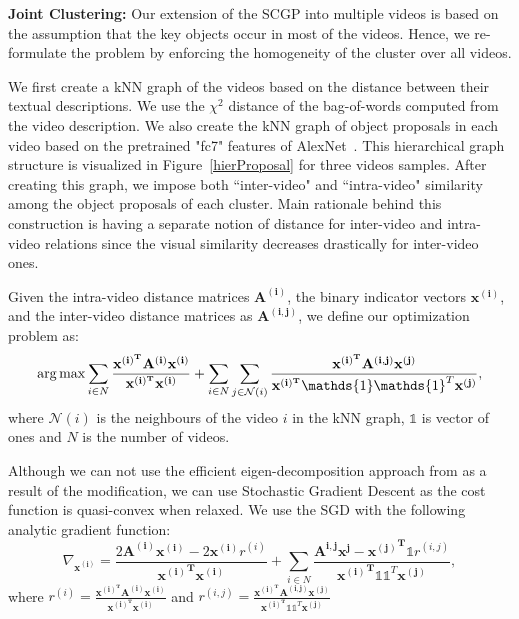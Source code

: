 \noindent\textbf{Joint Clustering:} Our extension of the SCGP into multiple videos is based on the assumption that the key objects occur in most of the videos. Hence, we re-formulate the problem by enforcing the homogeneity of the cluster over all videos.

We first create a kNN graph of the videos based on the distance between their textual descriptions. We use the $\chi^2$ distance of the bag-of-words computed from the video description. We also create the kNN graph of object proposals in each video based on the pretrained "fc7" features of AlexNet~\cite{alexnet}. This hierarchical graph structure is visualized in Figure~\ref{hierProposal} for three videos samples. After creating this graph, we impose both ``inter-video" and ``intra-video" similarity among the object proposals of each cluster. Main rationale behind this construction is having a separate notion of distance for inter-video and intra-video relations since the visual similarity decreases drastically for inter-video ones.

Given the intra-video distance matrices $\mathbf{A^{(i)}}$, the binary indicator vectors $\mathbf{x^{(i)}}$, and the inter-video distance matrices as $\mathbf{A^{(i,j)}}$, we define our optimization problem as:
\begin{equation}
\argmax \sum_{i \in N} \frac{\mathbf{x^{(i)^T}}\mathbf{A^{(i)}}\mathbf{x^{(i)}}}{\mathbf{x^{(i)^T}}\mathbf{x^{(i)}}} +
\sum_{i \in N} \sum_{j \in \mathcal{N}(i)} \frac{\mathbf{x^{(i)^T}}\mathbf{A^{(i,j)}}\mathbf{x^{(j)}}} {\mathbf{x^{(i)^T}}\mathds{1}\mathds{1}^T\mathbf{x^{(j)}}},
\end{equation}
where $\mathcal{N}(i)$ is the neighbours of the video $i$ in the kNN graph, $\mathds{1}$ is vector of ones and $N$ is the number of videos.

Although we can not use the efficient eigen-decomposition approach from \cite{scgp,scgp_eigen} as a result of the modification, we can use Stochastic Gradient Descent as the cost function is quasi-convex when relaxed. We use the SGD with the following analytic gradient function:
\begin{equation}
  \nabla_{\mathbf{x^{(i)}}} = \frac{2\mathbf{A^{(i)}} \mathbf{x^{(i)}} -2\mathbf{x^{(i)}} r^{(i)}}
  {\mathbf{{x^{(i)}}^T}\mathbf{x^{(i)}}}
+ \sum_{i \in N} \frac{\mathbf{A^{i,j}}\mathbf{x^{j}} - \mathbf{{x^{(j)}}^T} \mathds{1} r^{(i,j)}}{\mathbf{{x^{(i)}}^T} \mathds{1} \mathds{1}^T \mathbf{x^{(j)}} },
\end{equation}
where $r^{(i)}=\frac{\mathbf{x^{(i)^T}}\mathbf{A^{(i)}}\mathbf{x^{(i)}}}{\mathbf{x^{(i)^T}}\mathbf{x^{(i)}}}$ and $r^{(i,j)}=\frac{\mathbf{x^{(i)^T}}\mathbf{A^{(i,j)}}\mathbf{x^{(j)}}} {\mathbf{x^{(i)^T}}\mathds{1}\mathds{1}^T\mathbf{x^{(j)}}}$

